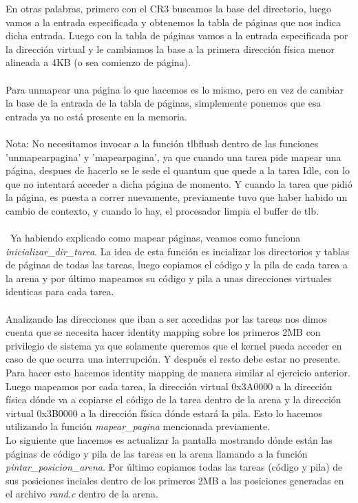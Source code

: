 En otras palabras, primero con el CR3 buscamos la base del directorio, luego vamos a la entrada especificada y obtenemos la tabla de páginas que nos indica dicha entrada. Luego con la tabla de páginas vamos a la entrada especificada por la dirección virtual y le cambiamos la base a la primera dirección física menor alineada a 4KB (o sea comienzo de página).\\\ \\
Para unmapear una página lo que hacemos es lo mismo, pero en vez de cambiar la base de la entrada de la tabla de páginas, simplemente ponemos que esa entrada ya no está presente en la memoria.\\
\\
Nota: No necesitamos invocar a la función tlbflush dentro de las funciones 'unmapearpagina' y 'mapearpagina', ya que cuando una tarea pide mapear una página, despues de hacerlo se le sede el quantum que quede a la tarea Idle, con lo que no intentará acceder a dicha página de momento. Y cuando la tarea que pidió la página, es puesta a correr nuevamente, previamente tuvo que haber habido un cambio de contexto, y cuando lo hay, el procesador limpia el buffer de tlb.
\\ \\\
Ya habiendo explicado como mapear páginas, veamos como funciona \textit{inicializar\_dir\_tarea}. La idea de esta función es incializar los directorios y tablas de páginas de todas las tareas, luego copiamos el código y la pila de cada tarea a la arena y por último mapeamos su código y pila a unas direcciones virtuales identicas para cada tarea.\\
\\
Analizando las direcciones que iban a ser accedidas por las tareas nos dimos cuenta que se necesita hacer identity mapping sobre los primeros 2MB con privilegio de sistema ya que solamente queremos que el kernel pueda acceder en caso de que ocurra una interrupción. Y después el resto debe estar no presente.\\
Para hacer esto hacemos identity mapping de manera similar al ejercicio anterior.\\
Luego mapeamos por cada tarea, la dirección virtual 0x3A0000 a la dirección física dónde va a copiarse el código de la tarea dentro de la arena y la dirección virtual 0x3B0000 a la dirección física dónde estará la pila. Esto lo hacemos utilizando la función \textit{mapear\_pagina} mencionada previamente.\\

Lo siguiente que hacemos es actualizar la pantalla mostrando dónde están las páginas de código y pila de las tareas en la arena llamando a la función \textit{pintar\_posicion\_arena}. Por último copiamos todas las tareas (código y pila) de sus posiciones inciales dentro de los primeros 2MB a las posiciones generadas en el archivo \textit{rand.c} dentro de la arena.
